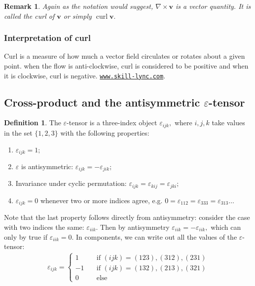 \documentclass[12pt, a4paper]{article}
\newcommand{\mb}[1]{\mathbf{#1}}
\DeclareMathOperator{\Curl}{curl}
\newtheorem*{remark}{Remark}
\theoremstyle{definition}
\newtheorem{definition}{Definition}[section]
\theoremstyle{plain}
\begin{document}
\begin{remark}
Again as the notation would suggest, $\nabla \times \mb{v}$ is a vector quantity. It is called the \textit{curl} of $\mb{v}$ or simply $\Curl{\mb{v}}.$
\end{remark}



\subsubsection*{Interpretation of curl}

Curl is a measure of how much a vector field circulates or rotates about a given point. when the flow is anti-clockwise, curl is considered to be positive and when it is clockwise, curl is negative. \href{https://skill-lync.com/blogs/what-is-the-physical-meaning-of-divergence-curl-and-gradient-of-a-vector-field}{\nolinkurl{www.skill-lync.com}}.

\subsection{Cross-product and the antisymmetric \texorpdfstring{$\varepsilon$}{TEXT}-tensor}

\begin{definition}
The $\varepsilon$-tensor is a three-index object $\varepsilon_{ijk},$ where $i, j, k$ take values in the set
$\{1, 2, 3\}$ with the following properties:
\begin{enumerate}
	
	\item $\varepsilon_{ijk}=1;$
	\item $\varepsilon$ is antisymmetric: $\varepsilon_{ijk}=-\varepsilon_{jik};$
	\item Invariance under cyclic permutation: $\varepsilon_{ijk} = \varepsilon_{kij} = \varepsilon_{jki};$
	\item $\varepsilon_{ijk}=0$ whenever two or more indices agree, e.g. $0 = \varepsilon_{112} = \varepsilon_{333} = \varepsilon_{313}\ldots$

\end{enumerate}
\end{definition} 

Note that the last property follows directly from antisymmetry: consider the case with two indices the same: $\varepsilon_{iik}.$ Then by antisymmetry $\varepsilon_{iik} = -\varepsilon_{iik},$ which can only by true if $\varepsilon_{iik} = 0.$ In components, we can write out all the values of the $\varepsilon$-tensor: $$\begin{aligned}
\varepsilon_{ijk}=\begin{cases}
1\quad &\text{if } (ijk) =(123),(312),(231)\\
-1 \quad &\text{if } (ijk)=(132),(213),(321)\\
0 \quad &\text{else}
\end{cases}
\end{aligned}$$
\end{document}
